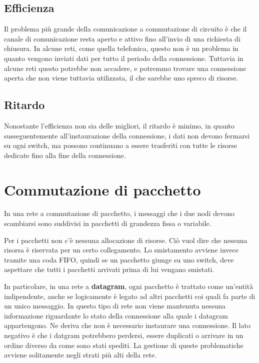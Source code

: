     \subsection{Efficienza}
        Il problema più grande della comunicazione a commutazione di circuito è che il canale di comunicazione resta aperto e attivo fino all'invio di una richiesta di chiusura. In alcune reti, come quella telefonica, questo non è un problema in quanto vengono inviati dati per tutto il periodo della connessione. Tuttavia in alcune reti questo potrebbe non accadere, e potremmo trovare una connessione aperta che non viene tuttavia utilizzata, il che sarebbe uno spreco di risorse.
        
    \subsection{Ritardo}
        Nonostante l'efficienza non sia delle migliori, il ritardo è minimo, in quanto susseguentemente all'instaurazione della connessione, i dati non devono fermarsi su ogni switch, ma possono continuano a essere trasferiti con tutte le risorse dedicate fino alla fine della connessione.
        
\section{Commutazione di pacchetto}
    In una rete a commutazione di pacchetto, i messaggi che i due nodi devono scambiarsi sono suddivisi in pacchetti di grandezza fissa o variabile.
    
    Per i pacchetti non c'è nessuna allocazione di risorse. Ciò vuol dire che nessuna risorsa è riservata per un certo collegamento. Lo smistamento avviene invece tramite una coda FIFO, quindi se un pacchetto giunge su uno switch, deve aspettare che tutti i pacchetti arrivati prima di lui vengano smistati.
    
    In particolare, in una rete a \textbf{datagram}, ogni pacchetto è trattato come un'entità indipendente, anche se logicamente è legato ad altri pacchetti coi quali fa parte di un unico messaggio. In questo tipo di rete non viene mantenuta nessuna informazione riguardante lo stato della connessione alla quale i datagram appartengono. Ne deriva che non è necessario instaurare una connessione. Il lato negativo è che i datgram potrebbero perdersi, essere duplicati o arrivare in un ordine diverso da come sono stati spediti. La gestione di queste problematiche avviene solitamente negli strati più alti della rete.
    
